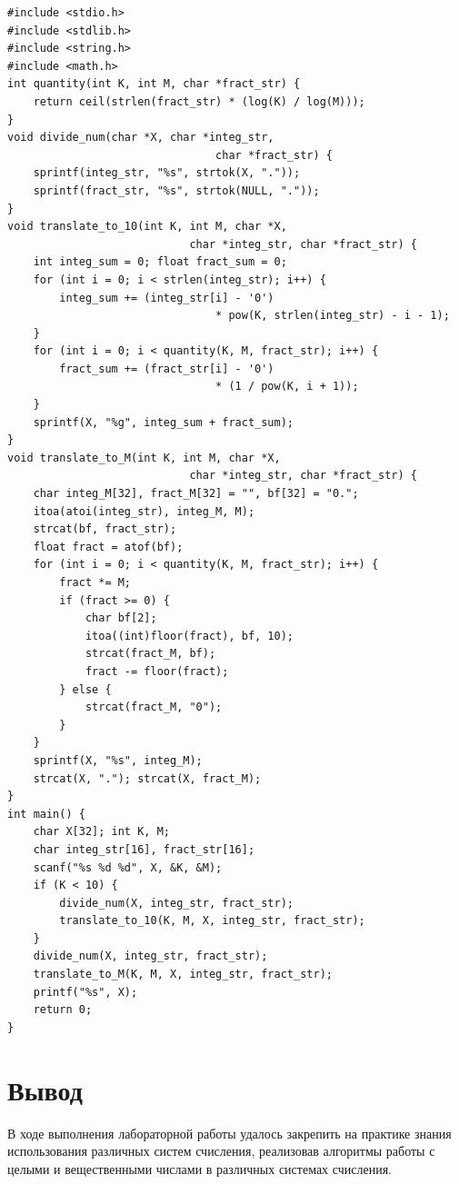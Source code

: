 \documentclass[a4paper,14pt]{extarticle}
\begin{document}
	\begin{lstlisting}[tabsize=2,basicstyle=\ttfamily]
#include <stdio.h>
#include <stdlib.h>
#include <string.h>
#include <math.h>
int quantity(int K, int M, char *fract_str) {
	return ceil(strlen(fract_str) * (log(K) / log(M)));
}
void divide_num(char *X, char *integ_str, 
								char *fract_str) {
	sprintf(integ_str, "%s", strtok(X, "."));
	sprintf(fract_str, "%s", strtok(NULL, "."));
}
void translate_to_10(int K, int M, char *X, 
							char *integ_str, char *fract_str) {
	int integ_sum = 0; float fract_sum = 0;
	for (int i = 0; i < strlen(integ_str); i++) {
		integ_sum += (integ_str[i] - '0') 
								* pow(K, strlen(integ_str) - i - 1);
	}
	for (int i = 0; i < quantity(K, M, fract_str); i++) {
		fract_sum += (fract_str[i] - '0') 
								* (1 / pow(K, i + 1));
	}
	sprintf(X, "%g", integ_sum + fract_sum);
}
void translate_to_M(int K, int M, char *X, 
							char *integ_str, char *fract_str) {
	char integ_M[32], fract_M[32] = "", bf[32] = "0.";
	itoa(atoi(integ_str), integ_M, M);
	strcat(bf, fract_str);
	float fract = atof(bf);
	for (int i = 0; i < quantity(K, M, fract_str); i++) {
		fract *= M;
		if (fract >= 0) {
			char bf[2];
			itoa((int)floor(fract), bf, 10);
			strcat(fract_M, bf);
			fract -= floor(fract);
		} else {
			strcat(fract_M, "0");
		}
	}
	sprintf(X, "%s", integ_M);
	strcat(X, "."); strcat(X, fract_M);
}
int main() {
	char X[32]; int K, M; 
	char integ_str[16], fract_str[16];
	scanf("%s %d %d", X, &K, &M);
	if (K < 10) {
		divide_num(X, integ_str, fract_str);
		translate_to_10(K, M, X, integ_str, fract_str);
	}
	divide_num(X, integ_str, fract_str);
	translate_to_M(K, M, X, integ_str, fract_str);
	printf("%s", X);
	return 0;
}
	\end{lstlisting}
	
	\section*{Вывод}
	В ходе выполнения лабораторной работы удалось закрепить на практике знания использования различных систем счисления, реализовав алгоритмы работы с целыми и вещественными числами в различных системах счисления.
	
\end{document}
